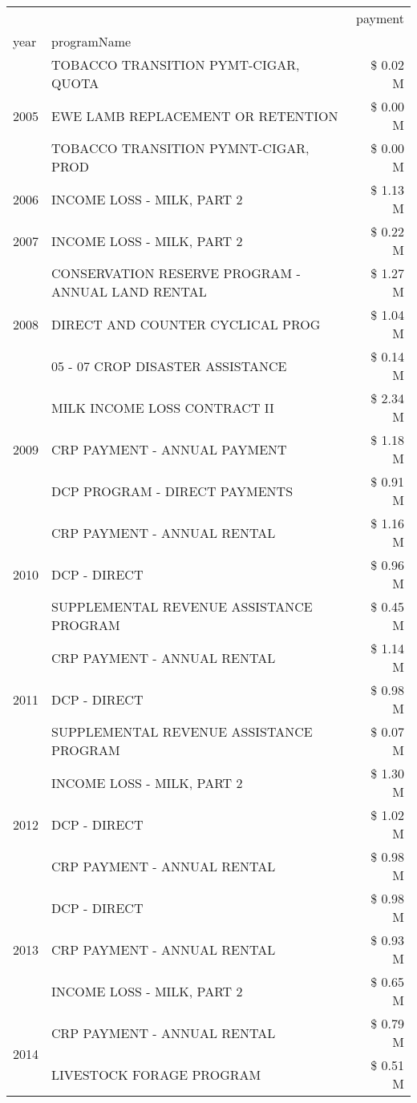 \begin{tabular}{llr}
\toprule
 &  & payment \\
year & programName &  \\
\midrule
\multirow[t]{3}{*}{2005} & TOBACCO TRANSITION PYMT-CIGAR, QUOTA & \$ 0.02 M \\
 & EWE LAMB REPLACEMENT OR RETENTION & \$ 0.00 M \\
 & TOBACCO TRANSITION PYMNT-CIGAR, PROD & \$ 0.00 M \\
\cline{1-3}
2006 & INCOME LOSS - MILK, PART 2 & \$ 1.13 M \\
\cline{1-3}
2007 & INCOME LOSS - MILK, PART 2 & \$ 0.22 M \\
\cline{1-3}
\multirow[t]{3}{*}{2008} & CONSERVATION RESERVE PROGRAM - ANNUAL LAND RENTAL & \$ 1.27 M \\
 & DIRECT AND COUNTER CYCLICAL PROG & \$ 1.04 M \\
 & 05 - 07 CROP DISASTER ASSISTANCE & \$ 0.14 M \\
\cline{1-3}
\multirow[t]{3}{*}{2009} & MILK INCOME LOSS CONTRACT II & \$ 2.34 M \\
 & CRP PAYMENT - ANNUAL PAYMENT & \$ 1.18 M \\
 & DCP PROGRAM - DIRECT PAYMENTS & \$ 0.91 M \\
\cline{1-3}
\multirow[t]{3}{*}{2010} & CRP PAYMENT - ANNUAL RENTAL & \$ 1.16 M \\
 & DCP - DIRECT & \$ 0.96 M \\
 & SUPPLEMENTAL REVENUE ASSISTANCE PROGRAM & \$ 0.45 M \\
\cline{1-3}
\multirow[t]{3}{*}{2011} & CRP PAYMENT - ANNUAL RENTAL & \$ 1.14 M \\
 & DCP - DIRECT & \$ 0.98 M \\
 & SUPPLEMENTAL REVENUE ASSISTANCE PROGRAM & \$ 0.07 M \\
\cline{1-3}
\multirow[t]{3}{*}{2012} & INCOME LOSS - MILK, PART 2 & \$ 1.30 M \\
 & DCP - DIRECT & \$ 1.02 M \\
 & CRP PAYMENT - ANNUAL RENTAL & \$ 0.98 M \\
\cline{1-3}
\multirow[t]{3}{*}{2013} & DCP - DIRECT & \$ 0.98 M \\
 & CRP PAYMENT - ANNUAL RENTAL & \$ 0.93 M \\
 & INCOME LOSS - MILK, PART 2 & \$ 0.65 M \\
\cline{1-3}
\multirow[t]{3}{*}{2014} & CRP PAYMENT - ANNUAL RENTAL & \$ 0.79 M \\
 & LIVESTOCK FORAGE PROGRAM & \$ 0.51 M \\

\end{tabular}

